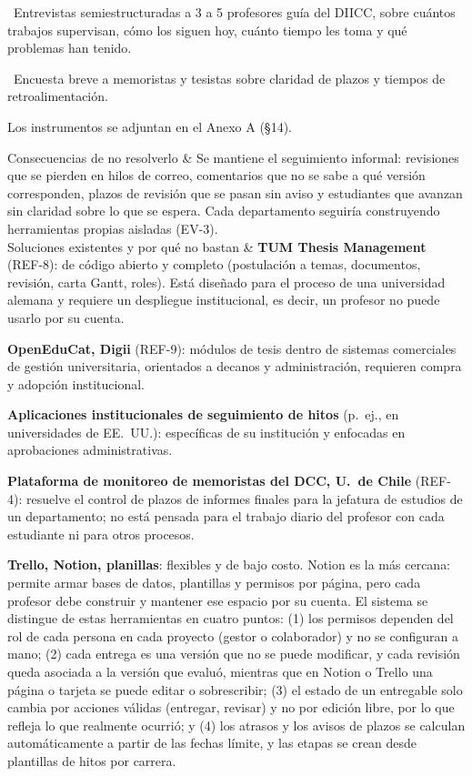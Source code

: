 \documentclass[10pt,a4paper]{article}
\newenvironment{kv}[1][4.6cm]
  {\footnotesize\setlength{\extrarowheight}{3pt}\xltabular{\linewidth}{|E{#1}|L|}\hline}
  {\endxltabular}
\newcommand{\kvrow}[2]{#1 & #2 \\ \hline}
\begin{document}
\begin{kv}[4.2cm]
{\textbullet~Entrevistas semiestructuradas a 3 a 5 profesores guía del DIICC, sobre cuántos trabajos supervisan, cómo los siguen hoy, cuánto tiempo les toma y qué problemas han tenido.\par
\textbullet~Encuesta breve a memoristas y tesistas sobre claridad de plazos y tiempos de retroalimentación.\par
Los instrumentos se adjuntan en el Anexo A (§14).}
\kvrow{Consecuencias de no resolverlo}{Se mantiene el seguimiento informal: revisiones que se pierden en hilos de correo, comentarios que no se sabe a qué versión corresponden, plazos de revisión que se pasan sin aviso y estudiantes que avanzan sin claridad sobre lo que se espera. Cada departamento seguiría construyendo herramientas propias aisladas (EV-3).}
\kvrow{Soluciones existentes y por qué no bastan}{%
\textbf{TUM Thesis Management} (REF-8): de código abierto y completo (postulación a temas, documentos, revisión, carta Gantt, roles). Está diseñado para el proceso de una universidad alemana y requiere un despliegue institucional, es decir, un profesor no puede usarlo por su cuenta.\par
\textbf{OpenEduCat, Digii} (REF-9): módulos de tesis dentro de sistemas comerciales de gestión universitaria, orientados a decanos y administración, requieren compra y adopción institucional.\par
\textbf{Aplicaciones institucionales de seguimiento de hitos} (p.~ej., en universidades de EE.~UU.): específicas de su institución y enfocadas en aprobaciones administrativas.\par
\textbf{Plataforma de monitoreo de memoristas del DCC, U.~de Chile} (REF-4): resuelve el control de plazos de informes finales para la jefatura de estudios de un departamento; no está pensada para el trabajo diario del profesor con cada estudiante ni para otros procesos.\par
\textbf{Trello, Notion, planillas}: flexibles y de bajo costo. Notion es la más cercana: permite armar bases de datos, plantillas y permisos por página, pero cada profesor debe construir y mantener ese espacio por su cuenta. El sistema se distingue de estas herramientas en cuatro puntos: (1) los permisos dependen del rol de cada persona en cada proyecto (gestor o colaborador) y no se configuran a mano; (2) cada entrega es una versión que no se puede modificar, y cada revisión queda asociada a la versión que evaluó, mientras que en Notion o Trello una página o tarjeta se puede editar o sobrescribir; (3) el estado de un entregable solo cambia por acciones válidas (entregar, revisar) y no por edición libre, por lo que refleja lo que realmente ocurrió; y (4) los atrasos y los avisos de plazos se calculan automáticamente a partir de las fechas límite, y las etapas se crean desde plantillas de hitos por carrera.\par
}
\end{kv}
\end{document}
